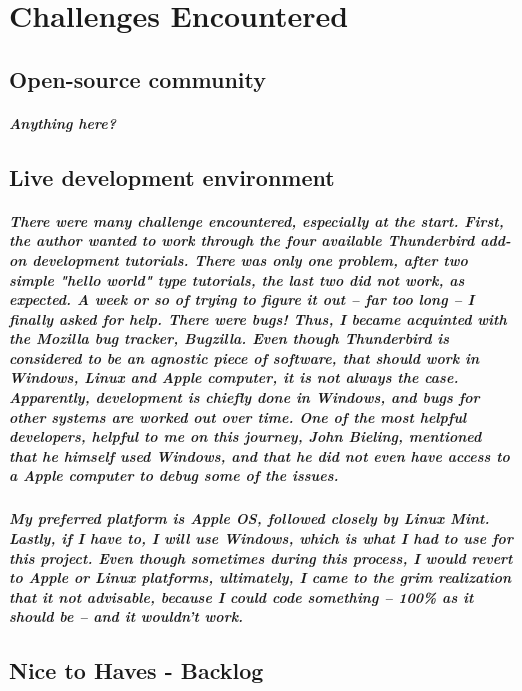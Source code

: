 \chapter{Challenges Encountered}

\section{Open-source community}
\paragraph{Anything here?}

\section{Live development environment}
\paragraph{There were many challenge encountered, especially at the start. First, the author wanted to work through the four available Thunderbird add-on development tutorials. There was only one problem, after two simple "hello world" type tutorials, the last two did not work, as expected. A week or so of trying to figure it out -- far too long -- I finally asked for help. There were bugs! Thus, I became acquinted with the Mozilla bug tracker, \emph{Bugzilla}. Even though Thunderbird is considered to be an agnostic piece of software, that should work in Windows, Linux and Apple computer, it is not always the case. Apparently, development is chiefly done in Windows, and bugs for other systems are worked out over time. One of the most helpful developers, helpful to me on this journey, John Bieling, mentioned that he himself used Windows, and that he did not even have access to a Apple computer to debug some of the issues.}

\paragraph{My preferred platform is Apple OS, followed closely by Linux Mint. Lastly, if I have to, I will use Windows, which is what I had to use for this project. Even though sometimes during this process, I would revert to Apple or Linux platforms, ultimately, I came to the grim realization that it not advisable, because I could code something -- 100\% as it should be -- and it wouldn't work.}

\section{Nice to Haves - Backlog}
